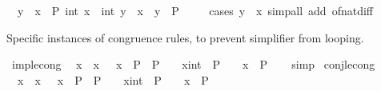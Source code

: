 \begin{isabellebody}
\ \ {\isacharparenleft}{\kern0pt}{\isacharparenleft}{\kern0pt}y\ {\isasymle}\ x\ {\isasymlongrightarrow}\ P\ {\isacharparenleft}{\kern0pt}int\ x\ {\isacharminus}{\kern0pt}\ int\ y{\isacharparenright}{\kern0pt}{\isacharparenright}{\kern0pt}\ {\isasymand}\ {\isacharparenleft}{\kern0pt}x\ {\isacharless}{\kern0pt}\ y\ {\isasymlongrightarrow}\ P\ {}{\isacharparenright}{\kern0pt}{\isacharparenright}{\kern0pt}{\isachardoublequoteclose}\isanewline
%
\isadelimproof
\ \ %
\endisadelimproof
%
\isatagproof
{}\isamarkupfalse%
\ {\isacharparenleft}{\kern0pt}cases\ {\isachardoublequoteopen}y\ {\isasymle}\ x{\isachardoublequoteclose}{\isacharparenright}{\kern0pt}\ {\isacharparenleft}{\kern0pt}simp{\isacharunderscore}{\kern0pt}all\ add{\isacharcolon}{\kern0pt}\ of{\isacharunderscore}{\kern0pt}nat{\isacharunderscore}{\kern0pt}diff{\isacharparenright}{\kern0pt}%
\endisatagproof
{\isafoldproof}%
%
\isadelimproof
%
\endisadelimproof
%
\begin{isamarkuptext}%
\medskip Specific instances of congruence rules, to prevent
  simplifier from looping.%
\end{isamarkuptext}\isamarkuptrue%
\isamarkupfalse%
\ imp{\isacharunderscore}{\kern0pt}le{\isacharunderscore}{\kern0pt}cong{\isacharcolon}{\kern0pt}\isanewline
\ \ {\isachardoublequoteopen}{\isasymlbrakk}x\ {\isacharequal}{\kern0pt}\ x{\isacharprime}{\kern0pt}{\isacharsemicolon}{\kern0pt}\ {}\ {\isasymle}\ x{\isacharprime}{\kern0pt}\ {\isasymLongrightarrow}\ P\ {\isacharequal}{\kern0pt}\ P{\isacharprime}{\kern0pt}{\isasymrbrakk}\ {\isasymLongrightarrow}\ {\isacharparenleft}{\kern0pt}{}\ {\isasymle}\ {\isacharparenleft}{\kern0pt}x{\isacharcolon}{\kern0pt}{\isacharcolon}{\kern0pt}int{\isacharparenright}{\kern0pt}\ {\isasymlongrightarrow}\ P{\isacharparenright}{\kern0pt}\ {\isacharequal}{\kern0pt}\ {\isacharparenleft}{\kern0pt}{}\ {\isasymle}\ x{\isacharprime}{\kern0pt}\ {\isasymlongrightarrow}\ P{\isacharprime}{\kern0pt}{\isacharparenright}{\kern0pt}{\isachardoublequoteclose}\isanewline
%
\isadelimproof
\ \ %
\endisadelimproof
%
\isatagproof
{}\isamarkupfalse%
\ simp%
\endisatagproof
{\isafoldproof}%
%
\isadelimproof
\isanewline
%
\endisadelimproof
\isanewline
{}\isamarkupfalse%
\ conj{\isacharunderscore}{\kern0pt}le{\isacharunderscore}{\kern0pt}cong{\isacharcolon}{\kern0pt}\isanewline
\ \ {\isachardoublequoteopen}{\isasymlbrakk}x\ {\isacharequal}{\kern0pt}\ x{\isacharprime}{\kern0pt}{\isacharsemicolon}{\kern0pt}\ {}\ {\isasymle}\ x{\isacharprime}{\kern0pt}\ {\isasymLongrightarrow}\ P\ {\isacharequal}{\kern0pt}\ P{\isacharprime}{\kern0pt}{\isasymrbrakk}\ {\isasymLongrightarrow}\ {\isacharparenleft}{\kern0pt}{}\ {\isasymle}\ {\isacharparenleft}{\kern0pt}x{\isacharcolon}{\kern0pt}{\isacharcolon}{\kern0pt}int{\isacharparenright}{\kern0pt}\ {\isasymand}\ P{\isacharparenright}{\kern0pt}\ {\isacharequal}{\kern0pt}\ {\isacharparenleft}{\kern0pt}{}\ {\isasymle}\ x{\isacharprime}{\kern0pt}\ {\isasymand}\ P{\isacharprime}{\kern0pt}{\isacharparenright}{\kern0pt}{\isachardoublequoteclose}\isanewline

\end{isabellebody}
